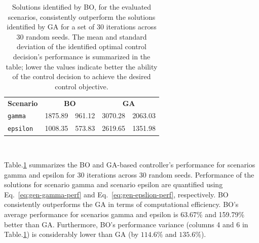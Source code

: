 

\begin{table}
\caption{Solutions identified by BO, for the evaluated scenarios, consistently outperform the solutions identified by GA for a set of 30 iterations across 30 random seeds.
The mean and standard deviation of the identified optimal control decision's performance is summarized in the table; lower the values indicate better the ability of the control decision to achieve the desired control objective.
}\label{tab:boga}
\begin{tabular}{p{0.5in}p{0.5in}p{0.5in}p{0.5in}p{0.5in}}
\toprule
\multirow{3}{*}{\textbf{Scenario}} & \multicolumn{2}{c}{\multirow{3}{*}{\textbf{BO}}} & \multicolumn{2}{c}{\multirow{3}{*}{\textbf{GA}}} \\
&    &  &  &   \\
&   $\mu$ & $\sigma$ & $\mu$ &  $\sigma$ \\ \midrule
\texttt{gamma}   & 1875.89 & 961.12 & 3070.28 & 2063.03 \\\midrule
\texttt{epsilon}  & 1008.35 & 573.83 & 2619.65 & 1351.98 \\
\bottomrule
\end{tabular}
\end{table}

\

Table.\ref{tab:boga} summarizes the BO and GA-based controller's performance for scenarios gamma and epsilon for 30 iterations across 30 random seeds.
Performance of the solutions for scenario gamma and scenario epsilon are quantified using Eq.~\ref{eq:gen-gamma-perf} and Eq.~\ref{eq:gen-epslion-perf}, respectively.
BO consistently outperforms the GA in terms of computational efficiency.
BO's average performance for scenarios gamma and epsilon is 63.67\% and 159.79\% better than GA\@. 
Furthermore, BO's performance variance (columns 4 and 6 in Table.\ref{tab:boga}) is considerably lower than GA (by $114.6\%$ and $135.6\%$).

